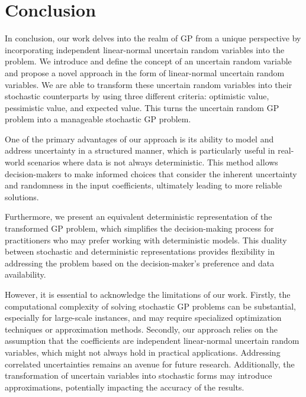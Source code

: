 \section{Conclusion}\label{sec.6}
 In conclusion, our work delves into the realm of GP from a unique perspective by incorporating independent linear-normal uncertain random variables into the problem. We introduce and define the concept of an uncertain random variable and propose a novel approach in the form of linear-normal uncertain random variables. We are able to transform these uncertain random variables into their stochastic counterparts by using three different criteria: optimistic value, pessimistic value, and expected value. This turns the uncertain random GP problem into a manageable stochastic GP problem.
 
\par One of the primary advantages of our approach is its ability to model and address uncertainty in a structured manner, which is particularly useful in real-world scenarios where data is not always deterministic. This method allows decision-makers to make informed choices that consider the inherent uncertainty and randomness in the input coefficients, ultimately leading to more reliable solutions.
 
 \par Furthermore, we present an equivalent deterministic representation of the transformed GP problem, which simplifies the decision-making process for practitioners who may prefer working with deterministic models. This duality between stochastic and deterministic representations provides flexibility in addressing the problem based on the decision-maker's preference and data availability.
 
 \par However, it is essential to acknowledge the limitations of our work. Firstly, the computational complexity of solving stochastic GP problems can be substantial, especially for large-scale instances, and may require specialized optimization techniques or approximation methods. Secondly, our approach relies on the assumption that the coefficients are independent linear-normal uncertain random variables, which might not always hold in practical applications. Addressing correlated uncertainties remains an avenue for future research. Additionally, the transformation of uncertain variables into stochastic forms may introduce approximations, potentially impacting the accuracy of the results.
 

